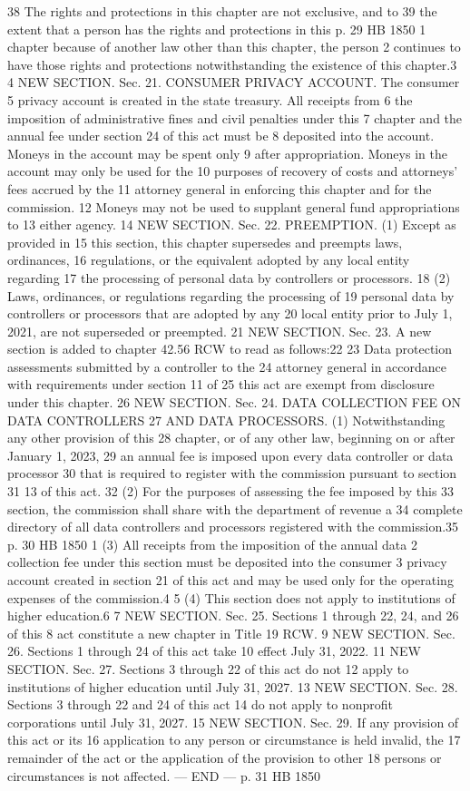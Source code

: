 38 The rights and protections in this chapter are not exclusive, and to
39 the extent that a person has the rights and protections in this
p. 29 HB 1850
1 chapter because of another law other than this chapter, the person
2 continues to have those rights and protections notwithstanding the
existence of this chapter.3
4 NEW SECTION. Sec. 21. CONSUMER PRIVACY ACCOUNT. The consumer
5 privacy account is created in the state treasury. All receipts from
6 the imposition of administrative fines and civil penalties under this
7 chapter and the annual fee under section 24 of this act must be
8 deposited into the account. Moneys in the account may be spent only
9 after appropriation. Moneys in the account may only be used for the
10 purposes of recovery of costs and attorneys' fees accrued by the
11 attorney general in enforcing this chapter and for the commission.
12 Moneys may not be used to supplant general fund appropriations to
13 either agency.
14 NEW SECTION. Sec. 22. PREEMPTION. (1) Except as provided in
15 this section, this chapter supersedes and preempts laws, ordinances,
16 regulations, or the equivalent adopted by any local entity regarding
17 the processing of personal data by controllers or processors.
18 (2) Laws, ordinances, or regulations regarding the processing of
19 personal data by controllers or processors that are adopted by any
20 local entity prior to July 1, 2021, are not superseded or preempted.
21 NEW SECTION. Sec. 23. A new section is added to chapter 42.56
RCW to read as follows:22
23 Data protection assessments submitted by a controller to the
24 attorney general in accordance with requirements under section 11 of
25 this act are exempt from disclosure under this chapter.
26 NEW SECTION. Sec. 24. DATA COLLECTION FEE ON DATA CONTROLLERS
27 AND DATA PROCESSORS. (1) Notwithstanding any other provision of this
28 chapter, or of any other law, beginning on or after January 1, 2023,
29 an annual fee is imposed upon every data controller or data processor
30 that is required to register with the commission pursuant to section
31 13 of this act.
32 (2) For the purposes of assessing the fee imposed by this
33 section, the commission shall share with the department of revenue a
34 complete directory of all data controllers and processors registered
with the commission.35
p. 30 HB 1850
1 (3) All receipts from the imposition of the annual data
2 collection fee under this section must be deposited into the consumer
3 privacy account created in section 21 of this act and may be used
only for the operating expenses of the commission.4
5 (4) This section does not apply to institutions of higher
education.6
7 NEW SECTION. Sec. 25. Sections 1 through 22, 24, and 26 of this
8 act constitute a new chapter in Title 19 RCW.
9 NEW SECTION. Sec. 26. Sections 1 through 24 of this act take
10 effect July 31, 2022.
11 NEW SECTION. Sec. 27. Sections 3 through 22 of this act do not
12 apply to institutions of higher education until July 31, 2027.
13 NEW SECTION. Sec. 28. Sections 3 through 22 and 24 of this act
14 do not apply to nonprofit corporations until July 31, 2027.
15 NEW SECTION. Sec. 29. If any provision of this act or its
16 application to any person or circumstance is held invalid, the
17 remainder of the act or the application of the provision to other
18 persons or circumstances is not affected.
--- END ---
p. 31 HB 1850